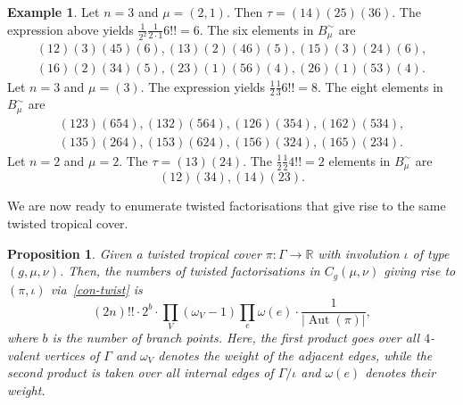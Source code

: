 \documentclass[11pt]{article}
\newtheorem{prop}[theo]{Proposition}
\theoremstyle{definition}
\newtheorem{exam}[theo]{Example}
\numberwithin{equation}{section}
\DeclareMathOperator{\Aut}{Aut}
\begin{document}
\begin{exam}
Let $n=3$ and $\mu=(2,1)$. Then $\tau=(14)(25)(36)$.
The expression above yields $\frac{1}{2^2}\frac{1}{2\cdot 1}6!! = 6$.
The six elements in $B^{\sim}_\mu$ are
\begin{gather*}
    (12)(3)(45)(6), (13)(2)(46)(5), (15)(3)(24)(6), \\
    (16)(2)(34)(5), (23)(1)(56)(4), (26)(1)(53)(4).
\end{gather*}
\noindent
Let $n=3$ and $\mu=(3)$. The expression yields $\frac{1}{2}\frac{1}{3}6!!= 8$.
The eight elements in $B^{\sim}_\mu$ are
\begin{gather*}
    (123)(654), (132)(564), (126)(354), (162)(534), \\ 
    (135)(264), (153)(624), (156)(324), (165)(234).
\end{gather*}
\noindent
Let $n=2$ and $\mu=2$. The $\tau=(13)(24)$. The $\frac{1}{2}\frac{1}{2}4!!=2$ elements in $B^{\sim}_\mu$ are
$$ (12)(34), (14)(23).$$
\end{exam}

We are now ready to enumerate twisted factorisations that give rise to the same twisted tropical cover.

\begin{prop}\label{thm-covermult}
Given a twisted tropical cover $\pi\colon\Gamma\to\mathbb{R}$ with involution $\iota$ of type $(g,\mu,\nu)$. Then, the numbers of twisted factorisations in $C_g(\mu,\nu)$ giving rise to $(\pi,\iota)$ via~\cref{con-twist} is
\begin{equation*}
(2n)!!\cdot 2^{b}\cdot \prod_V (\omega_V-1)\prod_e\omega(e)\cdot \frac{1}{|\Aut(\pi)|},
\end{equation*}
where $b$ is the number of branch points. Here, the first product goes over all $4$-valent vertices of $\Gamma$ and $\omega_V$ denotes the weight of the adjacent edges, while the second product is taken over all internal edges of $\Gamma/\iota$ and $\omega(e)$ denotes their weight.
\end{prop}
\end{document}

